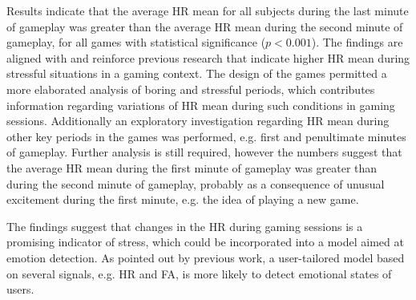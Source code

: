 Results indicate that the average HR mean for all subjects during the last minute of gameplay was greater than the average HR mean during the second minute of gameplay, for all games with statistical significance ($p<0.001$). The findings are aligned with and reinforce previous research that indicate higher HR mean during stressful situations in a gaming context. The design of the games permitted a more elaborated analysis of boring and stressful periods, which contributes information regarding variations of HR mean during such conditions in gaming sessions. Additionally an exploratory investigation regarding HR mean during other key periods in the games was performed, e.g. first and penultimate minutes of gameplay. Further analysis is still required, however the numbers suggest that the average HR mean during the first minute of gameplay was greater than during the second minute of gameplay, probably as a consequence of unusual excitement during the first minute, e.g. the idea of playing a new game.

The findings suggest that changes in the HR during gaming sessions is a promising indicator of stress, which could be incorporated into a model aimed at emotion detection. As pointed out by previous work, a user-tailored model based on several signals, e.g. HR and FA, is more likely to detect emotional states of users.
